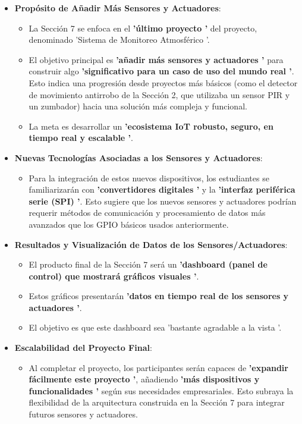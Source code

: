 \documentclass{report}
\begin{document}
\begin{itemize}
    \item \textbf{Propósito de Añadir Más Sensores y Actuadores}:
    \begin{itemize}
        \item La Sección 7 se enfoca en el \textbf{ 'último proyecto '} del proyecto, denominado  'Sistema de Monitoreo Atmosférico '.
        \item El objetivo principal es \textbf{ 'añadir más sensores y actuadores '} para construir algo \textbf{ 'significativo para un caso de uso del 
        mundo real '}. Esto indica una progresión desde proyectos más básicos (como el detector de movimiento antirrobo de la Sección 2, que utilizaba un 
        sensor PIR y un zumbador) hacia una solución más compleja y funcional.
        \item La meta es desarrollar un \textbf{ 'ecosistema IoT robusto, seguro, en tiempo real y escalable '}.
    \end{itemize}
    \item \textbf{Nuevas Tecnologías Asociadas a los Sensores y Actuadores}:
    \begin{itemize}
        \item Para la integración de estos nuevos dispositivos, los estudiantes se familiarizarán con \textbf{ 'convertidores digitales '} y la 
        \textbf{ 'interfaz periférica serie (SPI) '}. Esto sugiere que los nuevos sensores y actuadores podrían requerir métodos de comunicación y 
        procesamiento de datos más avanzados que los GPIO básicos usados anteriormente.
    \end{itemize}
    \item \textbf{Resultados y Visualización de Datos de los Sensores/Actuadores}:
    \begin{itemize}
        \item El producto final de la Sección 7 será un \textbf{ 'dashboard (panel de control) que mostrará gráficos visuales '}.
        \item Estos gráficos presentarán \textbf{ 'datos en tiempo real de los sensores y actuadores '}.
        \item El objetivo es que este dashboard sea  'bastante agradable a la vista '.
    \end{itemize}
    \item \textbf{Escalabilidad del Proyecto Final}:
    \begin{itemize}
        \item Al completar el proyecto, los participantes serán capaces de \textbf{ 'expandir fácilmente este proyecto '}, añadiendo 
        \textbf{ 'más dispositivos y funcionalidades '} según sus necesidades empresariales. Esto subraya la flexibilidad de la arquitectura 
        construida en la Sección 7 para integrar futuros sensores y actuadores.
    \end{itemize}
\end{itemize}
\end{document}

